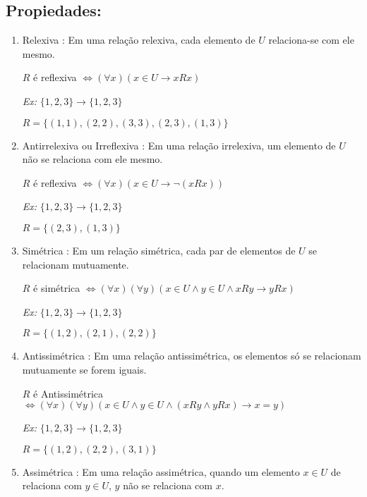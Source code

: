 \subsection{Propiedades:}
     \begin{enumerate}
        \item Relexiva : Em uma relação relexiva, cada elemento de $U$ relaciona-se com ele mesmo.
        
        $R$ é reflexiva $\Leftrightarrow (\forall x)(x  \in  U \rightarrow xRx)$ 
        
        \textit{Ex:} $\{1,2,3\} \rightarrow  \{1,2,3\}$
        
        $R = \{(1,1),(2,2),(3,3),(2,3),(1,3)\}$
        
        \item Antirrelexiva ou Irreflexiva : Em uma relação irrelexiva, um elemento de $U$ não se relaciona com ele mesmo.
        
        $R$ é reflexiva $\Leftrightarrow (\forall x)(x  \in  U \rightarrow \neg(xRx))$ 
        
        \textit{Ex:} $\{1,2,3\} \rightarrow  \{1,2,3\}$
        
        $R = \{(2,3),(1,3)\}$
        
        \item Simétrica : Em um relação simétrica, cada par de elementos de $U$ se relacionam mutuamente.
        
        $R$ é simétrica $\Leftrightarrow (\forall x)( \forall  y)(x \in U \wedge y \in U \wedge xRy  \rightarrow  yRx)$
        
        \textit{Ex:} $\{1,2,3\} \rightarrow  \{1,2,3\}$
        
        $R = \{(1,2),(2,1),(2,2)\}$
        
        
        \item Antissimétrica : Em uma relação antissimétrica, os elementos só se relacionam mutuamente se forem iguais.
        
        $R$ é Antissimétrica $\Leftrightarrow (\forall x)( \forall  y)(x \in U \wedge y \in U \wedge (xRy  \wedge yRx) \rightarrow x=y)$
        
        \textit{Ex:} $\{1,2,3\} \rightarrow  \{1,2,3\}$
        
        $R = \{(1,2),(2,2),(3,1)\}$
        
        \item Assimétrica : Em uma relação assimétrica, quando um elemento $x\in U$ de relaciona com  $y\in U$, $y$ não se relaciona com $x$.
        

\end{enumerate}
